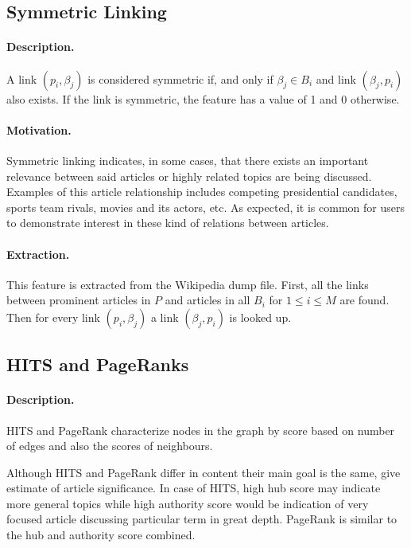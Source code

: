 \subsection{Symmetric Linking}
\label{symmetric linking}
\paragraph{Description.}
A link $(p_i, \beta_j)$ is considered symmetric if, and only if $\beta_j \in B_i$ and link $(\beta_j, p_i)$ also exists. If the link is symmetric, the feature has a value of 1 and 0 otherwise.

\paragraph{Motivation.}
Symmetric linking indicates, in some cases, that there exists an important relevance between said articles or highly related topics are being discussed. Examples of this article relationship includes competing presidential candidates, sports team rivals, movies and its actors, etc. As expected, it is common for users to demonstrate interest in these kind of relations between articles.

\paragraph{Extraction.}
This feature is extracted from the Wikipedia dump file. First, all the links between prominent articles in $P$ and articles in all $B_i$ for $1 \le i \le M$ are found. Then for every link $(p_i, \beta_j)$ a link $(\beta_j, p_i)$ is looked up.

\subsection{HITS and PageRanks}
\label{hits and pagerank}
\paragraph{Description.}
HITS and PageRank characterize nodes in the graph by score based on number of edges and also the scores of neighbours.

Although HITS and PageRank differ in content their main goal is the same, give estimate of article significance. In case of HITS, high hub score may indicate more general topics while high authority score would be indication of very focused article discussing particular term in great depth. PageRank is similar to the hub and authority score combined.

